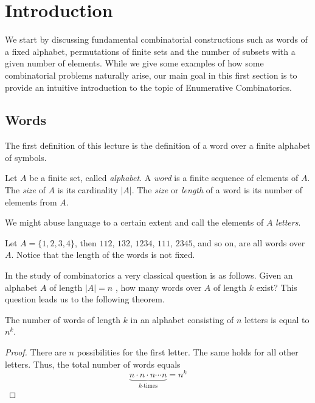 \section{Introduction}\label{introduction} 

We start by discussing fundamental combinatorial constructions such as words of a fixed alphabet, permutations of finite
sets and the number of subsets with a given number of elements. While we give some examples of how some combinatorial problems 
naturally arise, our main goal in this first section is to provide an intuitive introduction to the topic of 
Enumerative Combinatorics. 

\subsection{Words}

The first definition of this lecture is the definition of a word over a finite alphabet of symbols.

\begin{defn}[word]
Let $A$ be a finite set, called \textit{alphabet}. A \textit{word} is a finite sequence of elements of $A$. The \textit{size} of $A$ is its cardinality $|A|$.
The \textit{size} or \textit{length} of a word is its number of elements from $A$.
\end{defn}
\noindent
We might abuse language to a certain extent and call the elements of $A$ \textit{letters}.

\begin{exmp}
Let $A=\{1, 2, 3, 4\}$, then $112$, $132$, $1234$, $111$, $2345$, and so on, are all words over $A$.
Notice that the length of the words is not fixed.    
\end{exmp}

In the study of combinatorics a very classical question is as follows. Given an alphabet $A$ of length $|A|=n$ , how many words over $A$ of length $k$ exist? This question leads us to the following theorem.

\begin{theorem}
The number of words of length $k$ in an alphabet consisting of $n$ letters is equal to $n^k$.
\label{thmNumWords}
\end{theorem}
\begin{proof}
There are $n$ possibilities for the first letter. The same holds for all other letters.
Thus, the total number of words equals
$$
\underbrace{n \cdot n \cdot n \cdots n}_\text{$k$-times} = n^k
$$
\end{proof}

